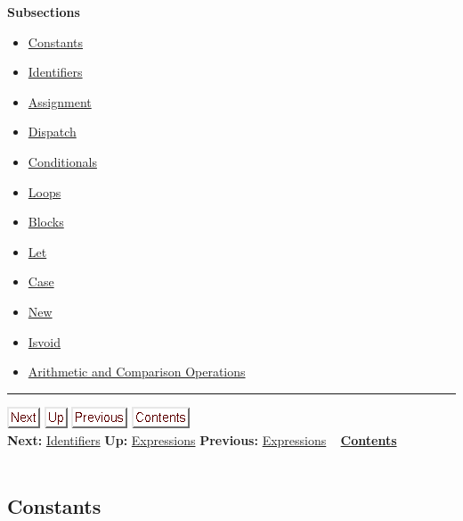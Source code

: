 \documentclass[]{article}
\begin{document}
\textbf{Subsections}

\begin{itemize}
\itemsep1pt\parskip0pt
\item
  \href{node14.html}{Constants}
\item
  \href{node15.html}{Identifiers}
\item
  \href{node16.html}{Assignment}
\item
  \href{node17.html}{Dispatch}
\item
  \href{node18.html}{Conditionals}
\item
  \href{node19.html}{Loops}
\item
  \href{node20.html}{Blocks}
\item
  \href{node21.html}{Let}
\item
  \href{node22.html}{Case}
\item
  \href{node23.html}{New}
\item
  \href{node24.html}{Isvoid}
\item
  \href{node25.html}{Arithmetic and Comparison Operations}
\end{itemize}

\begin{center}\rule{3in}{0.4pt}\end{center}

\href{node15.html}{\includegraphics{next.png}}
\href{node13.html}{\includegraphics{up.png}}
\href{node13.html}{\includegraphics{prev.png}}
\href{node1.html}{\includegraphics{contents.png}} \\ \textbf{Next:}
\href{node15.html}{Identifiers} \textbf{Up:}
\href{node13.html}{Expressions} \textbf{Previous:}
\href{node13.html}{Expressions} ~ \textbf{\href{node1.html}{Contents}}
\\ \\

\subsection{Constants}
\end{document}
